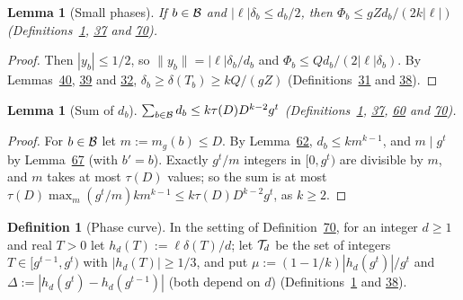 \documentclass[11pt]{article}
\newcounter{hffc}
\theoremstyle{definition}\newtheorem{hffdef}[hffc]{Definition}
\theoremstyle{plain}\newtheorem{hfflem}[hffc]{Lemma}\newtheorem{hffthm}[hffc]{Theorem}
\theoremstyle{remark}\newtheorem{hffrem}[hffc]{Remark}
\newcommand{\hffcost}{}
\newcommand{\setcost}[1]{\renewcommand{\hffcost}{#1}}
\begin{document}
\begin{hfflem}[Small phases]\label{L:small}
If $b\in\mathcal{B}$ and $|\ell|\delta_b\le d_b/2$, then $\Phi_b\le gZd_b/(2k|\ell|)$ (Definitions~\hyperref[D:conv]{1}, \hyperref[D:phase]{37} and \hyperref[D:count]{70}).
\par\nopagebreak{}
\end{hfflem}
\begin{proof}\setcost{length 103/300}Then $|y_b|\le1/2$, so $\|y_b\|=|\ell|\delta_b/d_b$ and $\Phi_b\le Qd_b/(2|\ell|\delta_b)$. By Lemmas~\hyperref[L:deltab]{40}, \hyperref[L:delta]{39} and \hyperref[L:lead]{32}, $\delta_b\ge\delta(T_b)\ge kQ/(gZ)$ (Definitions~\hyperref[D:node]{31} and \hyperref[D:arch]{38}).
\end{proof}

\begin{hfflem}[Sum of $d_b$]\label{L:sumd}
$\sum_{b\in\mathcal{B}}d_b\le k\tau(D)D^{k-2}g^t$ (Definitions~\hyperref[D:conv]{1}, \hyperref[D:phase]{37}, \hyperref[D:gpart]{60} and \hyperref[D:count]{70}).
\par\nopagebreak{}
\end{hfflem}
\begin{proof}\setcost{length 189/300}For $b\in\mathcal{B}$ let $m:=m_g(b)\le D$. By Lemma~\hyperref[L:gcd]{62}, $d_b\le km^{k-1}$, and $m\mid g^t$ by Lemma~\hyperref[L:rigid]{67} (with $b'=b$). Exactly $g^t/m$ integers in $[0,g^t)$ are divisible by $m$, and $m$ takes at most $\tau(D)$ values; so the sum is at most $\tau(D)\max_m(g^t/m)km^{k-1}\le k\tau(D)D^{k-2}g^t$, as $k\ge2$.
\end{proof}

\begin{hffdef}[Phase curve]\label{D:curve}
In the setting of Definition~\hyperref[D:count]{70}, for an integer $d\ge1$ and real $T>0$ let $h_d(T):=\ell\delta(T)/d$; let $\mathcal{T}_d$ be the set of integers $T\in[g^{t-1},g^t)$ with $|h_d(T)|\ge1/3$, and put $\mu:=(1-1/k)|h_d(g^t)|/g^t$ and $\Delta:=|h_d(g^t)-h_d(g^{t-1})|$ (both depend on $d$) (Definitions~\hyperref[D:conv]{1} and \hyperref[D:arch]{38}).
\par\nopagebreak{}
\end{hffdef}
\end{document}

